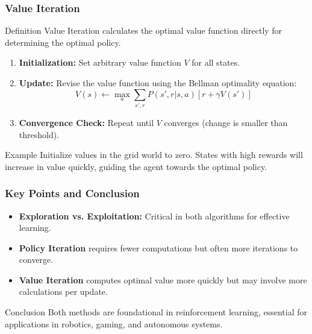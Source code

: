 \documentclass[aspectratio=169]{beamer}
\begin{document}
\begin{frame}[fragile]
    \frametitle{Value Iteration}
    
    \begin{block}{Definition}
        Value Iteration calculates the optimal value function directly for determining the optimal policy.
    \end{block}
    
    \begin{enumerate}
        \item \textbf{Initialization:} Set arbitrary value function $V$ for all states.
        \item \textbf{Update:} Revise the value function using the Bellman optimality equation:
        \begin{equation}
            V(s) \leftarrow \max_{a} \sum_{s', r} P(s', r | s, a) [r + \gamma V(s')]
        \end{equation}
        \item \textbf{Convergence Check:} Repeat until $V$ converges (change is smaller than threshold).
    \end{enumerate}

    \begin{block}{Example}
        Initialize values in the grid world to zero. States with high rewards will increase in value quickly, guiding the agent towards the optimal policy.
    \end{block}
\end{frame}

\begin{frame}[fragile]
    \frametitle{Key Points and Conclusion}
    
    \begin{itemize}
        \item \textbf{Exploration vs. Exploitation:} Critical in both algorithms for effective learning.
        \item \textbf{Policy Iteration} requires fewer computations but often more iterations to converge.
        \item \textbf{Value Iteration} computes optimal value more quickly but may involve more calculations per update.
    \end{itemize}

    \begin{block}{Conclusion}
        Both methods are foundational in reinforcement learning, essential for applications in robotics, gaming, and autonomous systems.
    \end{block}
\end{frame}
\end{document}
